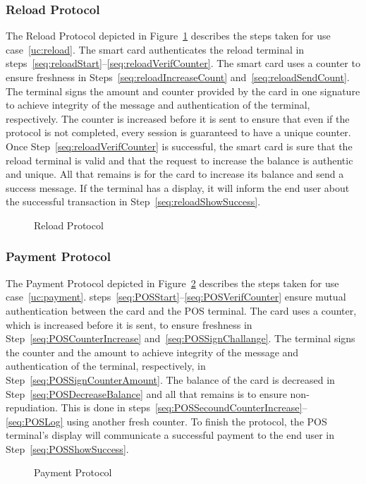 \subsubsection{Reload Protocol}
The Reload Protocol depicted in Figure~\ref{fig:ReloadProtocol} describes the steps taken for use case~\ref{uc:reload}.
The smart card authenticates the reload terminal in steps~\ref{seq:reloadStart}--\ref{seq:reloadVerifCounter}.
The smart card uses a counter to ensure freshness in Steps~\ref{seq:reloadIncreaseCount} and~\ref{seq:reloadSendCount}.
The terminal signs the amount and counter provided by the card in one signature to achieve integrity of the message and authentication of the terminal, respectively.
The counter is increased before it is sent to ensure that even if the protocol is not completed, every session is guaranteed to have a unique counter.
Once Step~\ref{seq:reloadVerifCounter} is successful, the smart card is sure that the reload terminal is valid and that the request to increase the balance is authentic and unique.
All that remains is for the card to increase its balance and send a success message.
If the terminal has a display, it will inform the end user about the successful transaction in Step~\ref{seq:reloadShowSuccess}.
 \begin{figure}[h!]
     \centering
     
     \caption{Reload Protocol}
     \label{fig:ReloadProtocol}
 \end{figure}

\subsubsection{Payment Protocol}
The Payment Protocol depicted in Figure~\ref{fig:POSProtocol} describes the steps taken for use case~\ref{uc:payment}.
steps~\ref{seq:POSStart}--\ref{seq:POSVerifCounter} ensure mutual authentication between the card and the POS terminal.
The card uses a counter, which is increased before it is sent, to ensure freshness in Step~\ref{seq:POSCounterIncrease} and~\ref{seq:POSSignChallange}.
The terminal signs the counter and the amount to achieve integrity of the message and authentication of the terminal, respectively, in Step~\ref{seq:POSSignCounterAmount}.
The balance of the card is decreased in Step~\ref{seq:POSDecreaseBalance} and all that remains is to ensure non-repudiation.
This is done in steps~\ref{seq:POSSecoundCounterIncrease}--\ref{seq:POSLog} using another fresh counter.
To finish the protocol, the POS terminal's display will communicate a successful payment to the end user in Step~\ref{seq:POSShowSuccess}.
\begin{figure}[h!]
    \centering
    
    \caption{Payment Protocol}
    \label{fig:POSProtocol}
\end{figure}



